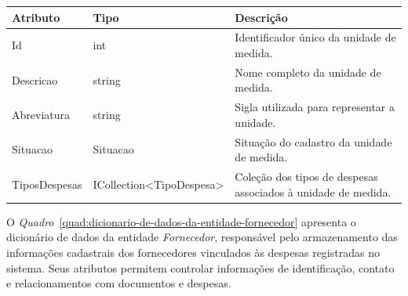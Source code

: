 \begin{quadro}[H]
\caption[Dicionário de dados da entidade UnidadeMedida]{Dicionário de dados da entidade UnidadeMedida}
\label{quad:dicionario-de-dados-da-entidade-unidademedida}

\begin{tabular}{|p{}|p{}|p{}|}
\hline
\textbf{Atributo} & \textbf{Tipo} & \textbf{Descrição} \\ 
\hline
Id & int & Identificador único da unidade de medida. \\ 
\hline
Descricao & string & Nome completo da unidade de medida. \\ 
\hline
Abreviatura & string & Sigla utilizada para representar a unidade. \\ 
\hline
Situacao & Situacao & Situação do cadastro da unidade de medida. \\ 
\hline
TiposDespesas & ICollection<TipoDespesa> & Coleção dos tipos de despesas associados à unidade de medida. \\ 
\hline
\end{tabular}


\end{quadro}



O \textit{Quadro}~\ref{quad:dicionario-de-dados-da-entidade-fornecedor} apresenta o dicionário de dados da entidade \textit{Fornecedor}, responsável pelo armazenamento das informações cadastrais dos fornecedores vinculados às despesas registradas no sistema. Seus atributos permitem controlar informações de identificação, contato e relacionamentos com documentos e despesas.

